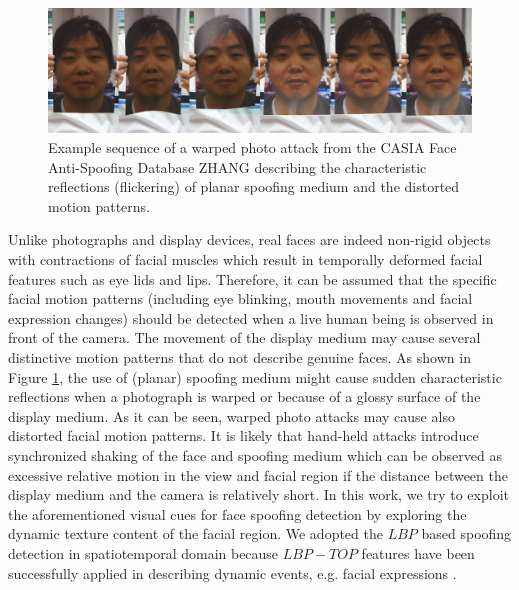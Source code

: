 \begin{figure}[!htb]
\begin{center}
\includegraphics [width=0.85\linewidth] {images/proposed_countermeasure/flicker.png}
\caption{Example sequence of a warped photo attack from the CASIA Face Anti-Spoofing Database ZHANG describing the characteristic reflections (flickering) of planar spoofing medium and the distorted motion patterns.} \label{fig:flickering}
\end{center}
\end{figure}

Unlike photographs and display devices, real faces are indeed non-rigid objects with contractions of facial muscles which result in temporally deformed facial features such as eye lids and lips. Therefore, it can be assumed that the specific facial motion patterns (including eye blinking, mouth movements and facial expression changes) should be detected when a live human being is observed in front of the camera. The movement of the display medium may cause several distinctive motion patterns that do not describe genuine faces. As shown in Figure \ref{fig:flickering}, the use of (planar) spoofing medium might cause sudden characteristic reflections when a photograph is warped or because of a glossy surface of the display medium. As it can be seen, warped photo attacks may cause also distorted facial motion patterns. It is likely that hand-held attacks introduce synchronized shaking of the face and spoofing medium which can be observed as excessive relative motion in the view and facial region if the distance between the display medium and the camera is relatively short. In this work, we try to exploit the aforementioned visual cues for face spoofing detection by exploring the dynamic texture content of the facial region. We adopted the $LBP$ based spoofing detection in spatiotemporal domain because $LBP-TOP$ features have been successfully applied in describing dynamic events, e.g. facial expressions \cite{zhao2007dynamic}.


